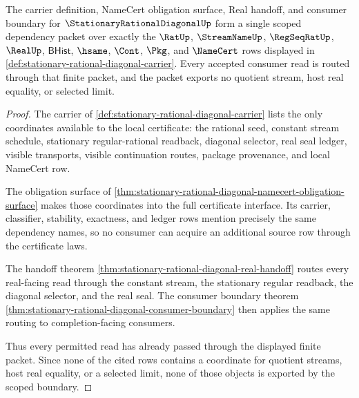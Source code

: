 \begin{theorem}
\label{thm:stationary-rational-diagonal-scoped-boundary}
The carrier definition, NameCert obligation surface, Real handoff, and consumer
boundary for $\StationaryRationalDiagonalUp$ form a single scoped dependency
packet over exactly the $\RatUp$, $\StreamNameUp$, $\RegSeqRatUp$, $\RealUp$,
$\mathsf{BHist}$, $\hsame$, $\Cont$, $\Pkg$, and $\NameCert$ rows displayed in
\autoref{def:stationary-rational-diagonal-carrier}. Every accepted consumer
read is routed through that finite packet, and the packet exports no quotient
stream, host real equality, or selected limit.
\end{theorem}
\begin{proof}
The carrier of \autoref{def:stationary-rational-diagonal-carrier} lists the
only coordinates available to the local certificate: the rational seed,
constant stream schedule, stationary regular-rational readback, diagonal
selector, real seal ledger, visible transports, visible continuation routes,
package provenance, and local NameCert row.

The obligation surface of
\autoref{thm:stationary-rational-diagonal-namecert-obligation-surface} makes
those coordinates into the full certificate interface. Its carrier,
classifier, stability, exactness, and ledger rows mention precisely the same
dependency names, so no consumer can acquire an additional source row through
the certificate laws.

The handoff theorem
\autoref{thm:stationary-rational-diagonal-real-handoff} routes every real-facing
read through the constant stream, the stationary regular readback, the diagonal
selector, and the real seal. The consumer boundary theorem
\autoref{thm:stationary-rational-diagonal-consumer-boundary} then applies the
same routing to completion-facing consumers.

Thus every permitted read has already passed through the displayed finite
packet. Since none of the cited rows contains a coordinate for quotient streams,
host real equality, or a selected limit, none of those objects is exported by
the scoped boundary.
\end{proof}

